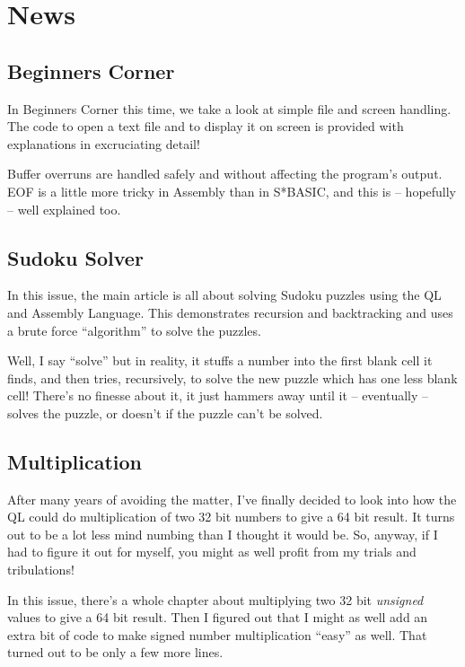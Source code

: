 
\chapter{News}

\section{Beginners Corner}

In Beginners Corner this time, we take a look at simple file and screen
handling. The code to open a text file and to display it on screen
is provided with explanations in excruciating detail!

Buffer overruns are handled safely and without affecting the program's
output. EOF is a little more tricky in Assembly than in S{*}BASIC,
and this is -- hopefully -- well explained too.

\section{Sudoku Solver}

In this issue, the main article is all about solving Sudoku puzzles
using the QL and Assembly Language. This demonstrates recursion and
backtracking and uses a brute force ``algorithm'' to solve the puzzles. 

Well, I say ``solve'' but in reality, it stuffs a number into the
first blank cell it finds, and then tries, recursively, to solve the
new puzzle which has one less blank cell! There's no finesse about
it, it just hammers away until it -- eventually -- solves the puzzle,
or doesn't if the puzzle can't be solved.

\section{Multiplication}

After many years of avoiding the matter, I've finally decided to look
into how the QL could do multiplication of two 32 bit numbers to give
a 64 bit result. It turns out to be a lot less mind numbing than I
thought it would be. So, anyway, if I had to figure it out for myself,
you might as well profit from my trials and tribulations!

In this issue, there's a whole chapter about multiplying two 32 bit
\emph{unsigned} values to give a 64 bit result. Then I figured out
that I might as well add an extra bit of code to make signed number
multiplication ``easy'' as well. That turned out to be only a few
more lines.

